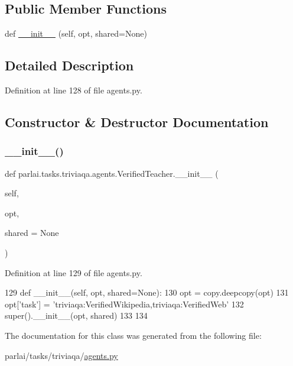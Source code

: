 \subsection*{Public Member Functions}
\begin{DoxyCompactItemize}
\item 
def \hyperlink{classparlai_1_1tasks_1_1triviaqa_1_1agents_1_1VerifiedTeacher_abef3ebd81d68d58d356a27bca5ec036c}{\+\_\+\+\_\+init\+\_\+\+\_\+} (self, opt, shared=None)
\end{DoxyCompactItemize}


\subsection{Detailed Description}


Definition at line 128 of file agents.\+py.



\subsection{Constructor \& Destructor Documentation}
\mbox{\label{classparlai_1_1tasks_1_1triviaqa_1_1agents_1_1VerifiedTeacher_abef3ebd81d68d58d356a27bca5ec036c}} 
\subsubsection{\texorpdfstring{\+\_\+\+\_\+init\+\_\+\+\_\+()}{\_\_init\_\_()}}
{\footnotesize\ttfamily def parlai.\+tasks.\+triviaqa.\+agents.\+Verified\+Teacher.\+\_\+\+\_\+init\+\_\+\+\_\+ (\begin{DoxyParamCaption}\item[{}]{self,  }\item[{}]{opt,  }\item[{}]{shared = {\ttfamily None} }\end{DoxyParamCaption})}



Definition at line 129 of file agents.\+py.


\begin{DoxyCode}
129     \textcolor{keyword}{def }\_\_init\_\_(self, opt, shared=None):
130         opt = copy.deepcopy(opt)
131         opt[\textcolor{stringliteral}{'task'}] = \textcolor{stringliteral}{'triviaqa:VerifiedWikipedia,triviaqa:VerifiedWeb'}
132         super().\_\_init\_\_(opt, shared)
133 
134 
\end{DoxyCode}


The documentation for this class was generated from the following file\+:\begin{DoxyCompactItemize}
\item 
parlai/tasks/triviaqa/\hyperlink{parlai_2tasks_2triviaqa_2agents_8py}{agents.\+py}\end{DoxyCompactItemize}

